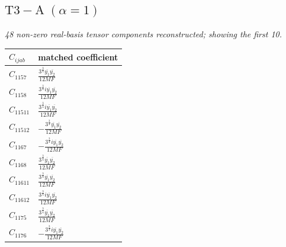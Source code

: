 \documentclass[9pt]{article}
\begin{document}
\subsection*{$ \mathrm{T3-A}\;(\alpha=1) $}
\textit{48 non-zero real-basis tensor components reconstructed; showing the first 10.}
\begin{longtable}{@{}ll@{}}
\toprule
$C_{ijab}$ & matched coefficient \\
\midrule
$C_{1157}$ & $ \frac{3^{\frac{3}{4}} \overline{y_{1}} \overline{y_{2}}}{12 MF} $ \\
$C_{1158}$ & $ \frac{3^{\frac{3}{4}} i \overline{y_{1}} \overline{y_{2}}}{12 MF} $ \\
$C_{11511}$ & $ \frac{3^{\frac{3}{4}} i \overline{y_{1}} \overline{y_{2}}}{12 MF} $ \\
$C_{11512}$ & $ - \frac{3^{\frac{3}{4}} \overline{y_{1}} \overline{y_{2}}}{12 MF} $ \\
$C_{1167}$ & $ - \frac{3^{\frac{3}{4}} i \overline{y_{1}} \overline{y_{2}}}{12 MF} $ \\
$C_{1168}$ & $ \frac{3^{\frac{3}{4}} \overline{y_{1}} \overline{y_{2}}}{12 MF} $ \\
$C_{11611}$ & $ \frac{3^{\frac{3}{4}} \overline{y_{1}} \overline{y_{2}}}{12 MF} $ \\
$C_{11612}$ & $ \frac{3^{\frac{3}{4}} i \overline{y_{1}} \overline{y_{2}}}{12 MF} $ \\
$C_{1175}$ & $ \frac{3^{\frac{3}{4}} \overline{y_{1}} \overline{y_{2}}}{12 MF} $ \\
$C_{1176}$ & $ - \frac{3^{\frac{3}{4}} i \overline{y_{1}} \overline{y_{2}}}{12 MF} $ \\
\bottomrule
\end{longtable}
\end{document}
